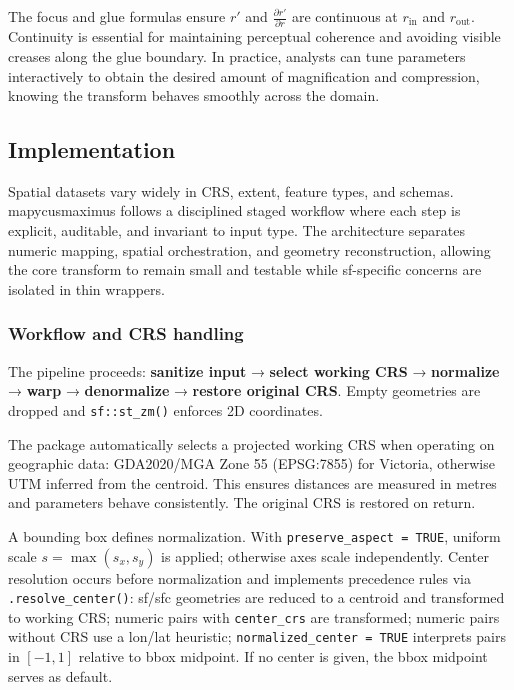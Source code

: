 The focus and glue formulas ensure \(r'\) and \(\frac{\partial r'}{\partial r}\) are continuous at
\(r_{\text{in}}\) and \(r_{\text{out}}\). Continuity is essential for maintaining perceptual
coherence and avoiding visible creases along the glue boundary. In practice, analysts can tune
parameters interactively to obtain the desired amount of magnification and compression, knowing the
transform behaves smoothly across the domain.

\subsection{Implementation}\label{implementation}

Spatial datasets vary widely in CRS, extent, feature types, and schemas. mapycusmaximus follows a disciplined staged workflow where each step is explicit, auditable, and invariant to input type. The architecture separates numeric mapping, spatial orchestration, and geometry reconstruction, allowing the core transform to remain small and testable while sf-specific concerns are isolated in thin wrappers.

\subsubsection{Workflow and CRS handling}\label{workflow-and-crs-handling}

The pipeline proceeds: \textbf{sanitize input} → \textbf{select working CRS} → \textbf{normalize} → \textbf{warp} → \textbf{denormalize} → \textbf{restore original CRS}. Empty geometries are dropped and \texttt{sf::st\_zm()} enforces 2D coordinates.

The package automatically selects a projected working CRS when operating on geographic data: GDA2020/MGA Zone 55 (EPSG:7855) for Victoria, otherwise UTM inferred from the centroid. This ensures distances are measured in metres and parameters behave consistently. The original CRS is restored on return.

A bounding box defines normalization. With \texttt{preserve\_aspect\ =\ TRUE}, uniform scale \(s = \max(s_x, s_y)\) is applied; otherwise axes scale independently. Center resolution occurs before normalization and implements precedence rules via \texttt{.resolve\_center()}: sf/sfc geometries are reduced to a centroid and transformed to working CRS; numeric pairs with \texttt{center\_crs} are transformed; numeric pairs without CRS use a lon/lat heuristic; \texttt{normalized\_center\ =\ TRUE} interprets pairs in \([-1, 1]\) relative to bbox midpoint. If no center is given, the bbox midpoint serves as default.

